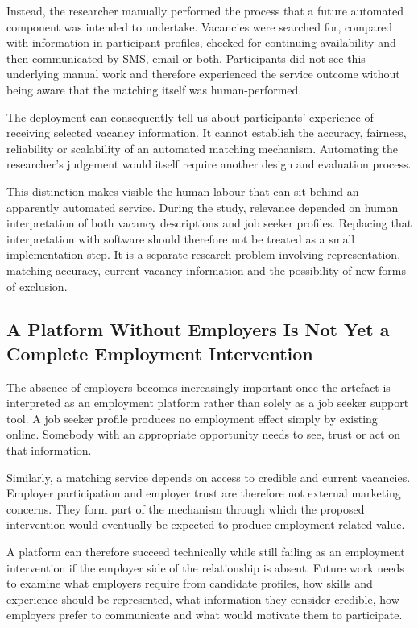 Instead, the researcher manually performed the process that a future automated component was intended to undertake. Vacancies were searched for, compared with information in participant profiles, checked for continuing availability and then communicated by SMS, email or both. Participants did not see this underlying manual work and therefore experienced the service outcome without being aware that the matching itself was human-performed.

The deployment can consequently tell us about participants' experience of receiving selected vacancy information. It cannot establish the accuracy, fairness, reliability or scalability of an automated matching mechanism. Automating the researcher's judgement would itself require another design and evaluation process.

This distinction makes visible the human labour that can sit behind an apparently automated service. During the study, relevance depended on human interpretation of both vacancy descriptions and job seeker profiles. Replacing that interpretation with software should therefore not be treated as a small implementation step. It is a separate research problem involving representation, matching accuracy, current vacancy information and the possibility of new forms of exclusion.


\subsection{A Platform Without Employers Is Not Yet a Complete Employment Intervention}

The absence of employers becomes increasingly important once the artefact is interpreted as an employment platform rather than solely as a job seeker support tool. A job seeker profile produces no employment effect simply by existing online. Somebody with an appropriate opportunity needs to see, trust or act on that information.

Similarly, a matching service depends on access to credible and current vacancies. Employer participation and employer trust are therefore not external marketing concerns. They form part of the mechanism through which the proposed intervention would eventually be expected to produce employment-related value.

A platform can therefore succeed technically while still failing as an employment intervention if the employer side of the relationship is absent. Future work needs to examine what employers require from candidate profiles, how skills and experience should be represented, what information they consider credible, how employers prefer to communicate and what would motivate them to participate.

